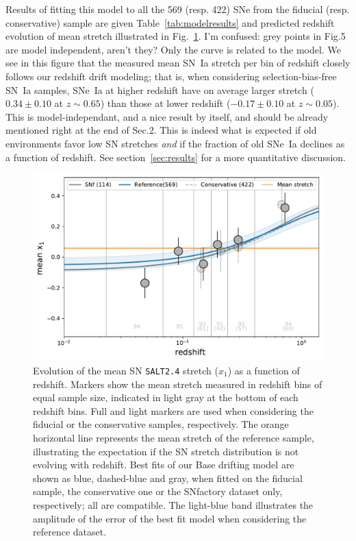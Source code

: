 \documentclass[]{aa} %
\newcommand{\yc}[1]{{\textcolor{BrickRed}{#1}}}
\begin{document}
Results of fitting this model to all the 569 (resp. 422) SNe from the fiducial
(resp. conservative) sample are given Table~\ref{tab:modelresults} and
\yc{predicted redshift evolution of mean stretch} illustrated in Fig.~\ref{fig:modelall}. \yc{I'm confused: grey points in Fig.5 are model independent, aren't they? Only the curve is related to the model.} We see in this figure that the measured
mean SN~Ia stretch per bin of redshift closely follows our redshift drift
modeling; that is, when considering selection-bias-free SN~Ia samples, SNe~Ia at
higher redshift have on average larger stretch ($0.34 \pm 0.10$ at $z\sim0.65$)
than those at lower redshift ($-0.17\pm 0.10$ at $z\sim0.05$). \yc{This is model-independant, and a nice result by itself, and should be already mentioned right at the end of Sec.2.}  This is indeed
what is expected if old environments favor low SN stretches
\citep[e.g.][]{howell2007} \emph{and} if the fraction of old SNe~Ia declines as
a function of redshift. See section~\ref{sec:results} for a more quantitative
discussion.

\begin{figure}
    \centering
    \includegraphics[width=0.7\linewidth]{Article_figures/stretchevol_all_vs_snf.pdf}
    \caption{Evolution of the mean SN \textsc{\texttt{SALT2.4}} stretch ($x_1$)
        as a function of redshift. Markers show the mean stretch measured in
        redshift bins of equal sample size, indicated in light gray at the
        bottom of each redshift bins. Full and light markers are used when
        considering the fiducial or the conservative samples, respectively. The
        orange horizontal line represents the mean stretch of the reference
        sample, illustrating the expectation if the SN stretch distribution is
        not evolving with redshift. Best fits of our Base drifting model are
        shown as blue, dashed-blue and gray, when fitted on the fiducial sample,
        the conservative one or the SNfactory dataset only, respectively; all
        are compatible. The light-blue band illustrates the amplitude of the
    error of the best fit model when considering the reference dataset.}
    \label{fig:modelall}
\end{figure}
\end{document}
